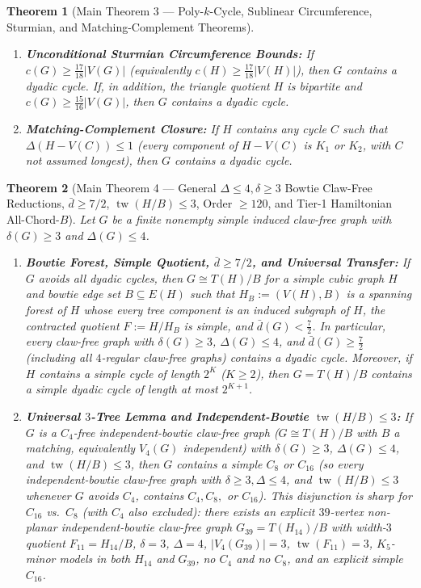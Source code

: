 \documentclass[11pt,reqno]{amsart}
\theoremstyle{plain}
\newtheorem{theorem}{Theorem}[section]
\theoremstyle{definition}
\theoremstyle{remark}
\newcommand{\tw}{\operatorname{tw}}
\DeclareRobustCommand{\_}{\ifmmode\text{\textunderscore}\else\textunderscore\allowbreak\fi}
\begin{document}
\begin{theorem}[Main Theorem 3 --- Poly-$k$-Cycle, Sublinear Circumference, Sturmian, and Matching-Complement Theorems]
\begin{enumerate}[label=(\alph*),leftmargin=2.2em]
  \item \textbf{Unconditional Sturmian Circumference Bounds:} If $c(G) \ge \frac{17}{18}|V(G)|$ (equivalently $c(H) \ge \frac{17}{18}|V(H)|$), then $G$ contains a dyadic cycle. If, in addition, the triangle quotient $H$ is \emph{bipartite} and $c(G) \ge \frac{15}{16}|V(G)|$, then $G$ contains a dyadic cycle.
  \item \textbf{Matching-Complement Closure:} If $H$ contains any cycle $C$ such that $\Delta(H - V(C)) \le 1$ (every component of $H - V(C)$ is $K_1$ or $K_2$, with $C$ not assumed longest), then $G$ contains a dyadic cycle.
\end{enumerate}
\end{theorem}

\begin{theorem}[Main Theorem 4 --- General $\Delta \le 4, \delta \ge 3$ Bowtie Claw-Free Reductions, $\bar{d} \ge 7/2$, $\tw(H/B) \le 3$, Order $\ge 120$, and Tier-1 Hamiltonian All-Chord-$B$]\label{thm:main4}
Let $G$ be a finite nonempty simple induced claw-free graph with $\delta(G) \ge 3$ and $\Delta(G) \le 4$.
\begin{enumerate}[label=(\alph*),leftmargin=2.2em]
  \item \textbf{Bowtie Forest, Simple Quotient, $\bar{d} \ge 7/2$, and Universal Transfer:} If $G$ avoids all dyadic cycles, then $G \cong T(H)/B$ for a simple cubic graph $H$ and bowtie edge set $B \subseteq E(H)$ such that $H_B := (V(H), B)$ is a spanning forest of $H$ whose every tree component is an induced subgraph of $H$, the contracted quotient $F := H/H_B$ is simple, and $\bar{d}(G) < \frac{7}{2}$. In particular, every claw-free graph with $\delta(G) \ge 3$, $\Delta(G) \le 4$, and $\bar{d}(G) \ge \frac{7}{2}$ (including all $4$-regular claw-free graphs) contains a dyadic cycle. Moreover, if $H$ contains a simple cycle of length $2^K$ ($K \ge 2$), then $G = T(H)/B$ contains a simple dyadic cycle of length at most $2^{K+1}$.
  \item \textbf{Universal $3$-Tree Lemma and Independent-Bowtie $\tw(H/B) \le 3$:} If $G$ is a $C_4$-free independent-bowtie claw-free graph ($G \cong T(H)/B$ with $B$ a matching, equivalently $V_4(G)$ independent) with $\delta(G) \ge 3$, $\Delta(G) \le 4$, and $\tw(H/B) \le 3$, then $G$ contains a simple $C_8$ \emph{or} $C_{16}$ (so every independent-bowtie claw-free graph with $\delta \ge 3, \Delta \le 4$, and $\tw(H/B) \le 3$ whenever $G$ avoids $C_4$, contains $C_4, C_8,$ or $C_{16}$). This disjunction is sharp for $C_{16}$ vs.\ $C_8$ (with $C_4$ also excluded): there exists an explicit $39$-vertex non-planar independent-bowtie claw-free graph $G_{39} = T(H_{14})/B$ with width-$3$ quotient $F_{11} = H_{14}/B$, $\delta = 3$, $\Delta = 4$, $|V_4(G_{39})| = 3$, $\tw(F_{11}) = 3$, $K_5$-minor models in both $H_{14}$ and $G_{39}$, no $C_4$ and no $C_8$, and an explicit simple $C_{16}$.

\end{enumerate}
\end{theorem}
\end{document}
